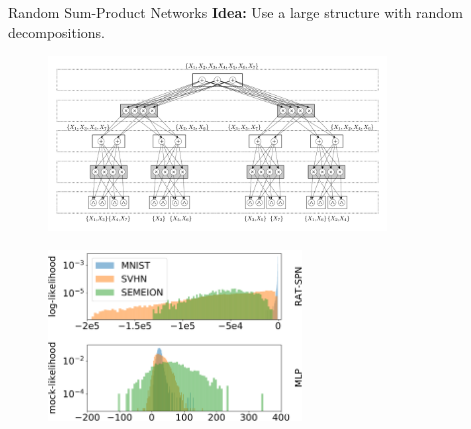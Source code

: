 \begin{frame}{Random Sum-Product Networks}{}
    \textbf{Idea:} Use a large structure with random decompositions.

    \begin{figure}
    \centering
    \includegraphics[width=0.8\textwidth]{example_RAT-SPN-eps-converted-to}
    \end{figure}

    \pause

    \begin{figure}
    \centering
    \includegraphics[width=0.6\textwidth]{transfer-testing-lambda-0-2-crop}
\end{figure}

\end{frame}

%

